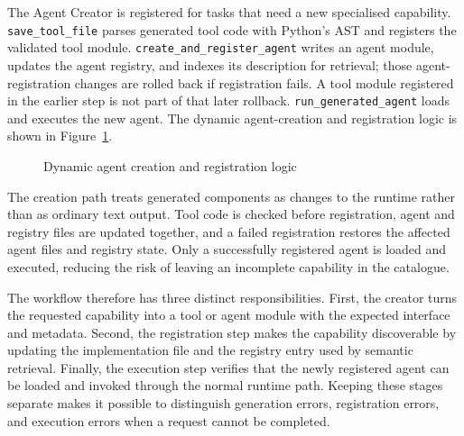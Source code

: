 The Agent Creator is registered for tasks that need a new specialised
capability. \texttt{save\_tool\_file} parses generated tool code with Python's
AST and registers the validated tool module. \texttt{create\_and\_register\_agent}
writes an agent module, updates the agent registry, and indexes its description
for retrieval; those agent-registration changes are rolled back if registration
fails. A tool module registered in the earlier step is not part of that later
rollback. \texttt{run\_generated\_agent} loads and executes the new agent.
The dynamic agent-creation and registration logic is shown in Figure~\ref{fig:agent-creator-logic}.
\begin{figure}[H]\centering
{}
\caption{Dynamic agent creation and registration logic}
\label{fig:agent-creator-logic}
\end{figure}
The creation path treats generated components as changes to the runtime rather than as ordinary text output. Tool code is checked before registration, agent and registry files are updated together, and a failed registration restores the affected agent files and registry state. Only a successfully registered agent is loaded and executed, reducing the risk of leaving an incomplete capability in the catalogue.

The workflow therefore has three distinct responsibilities. First, the creator turns the requested capability into a tool or agent module with the expected interface and metadata. Second, the registration step makes the capability discoverable by updating the implementation file and the registry entry used by semantic retrieval. Finally, the execution step verifies that the newly registered agent can be loaded and invoked through the normal runtime path. Keeping these stages separate makes it possible to distinguish generation errors, registration errors, and execution errors when a request cannot be completed.

